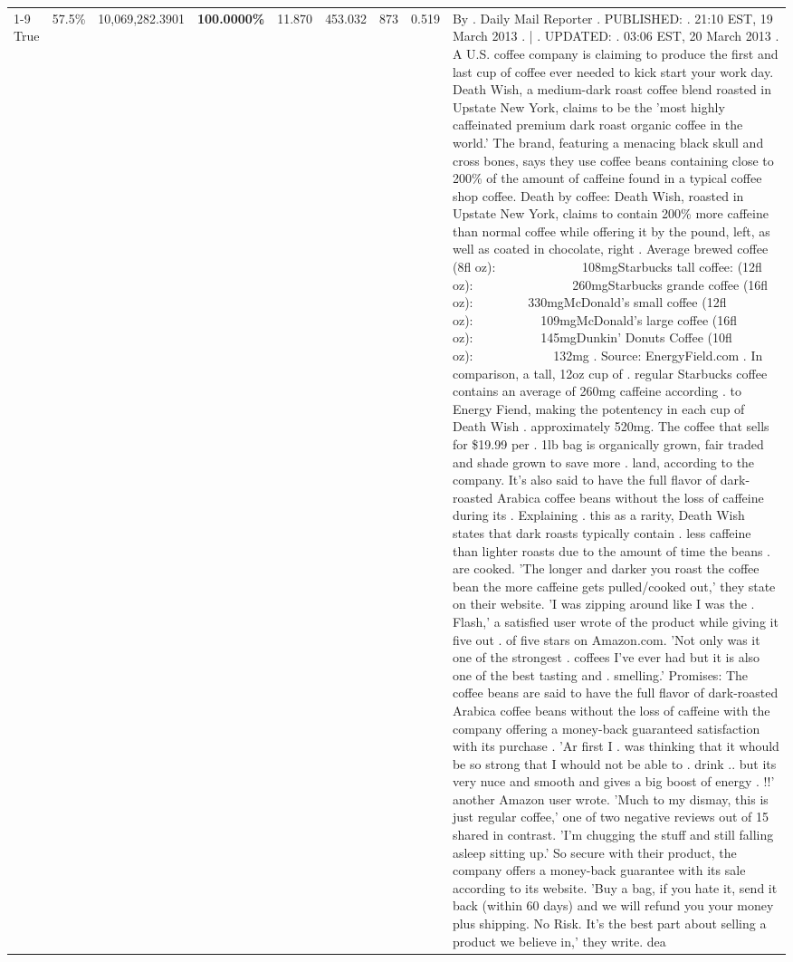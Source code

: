 \begin{table}[H]
{\begin{tabular}{lllrlllll}
\cline{1-9}
True & 57.5\% & 10,069,282.3901 & \bfseries \color{red} 100.0000\% & 11.870 & 453.032 & 873 & 0.519 & By . Daily Mail Reporter . PUBLISHED: . 21:10 EST, 19 March 2013 . | . UPDATED: . 03:06 EST, 20 March 2013 . A U.S. coffee company is claiming to produce the first and last cup of coffee ever needed to kick start your work day. Death Wish, a medium-dark roast coffee blend roasted in Upstate New York, claims to be the 'most highly caffeinated premium dark roast organic coffee in the world.' The brand, featuring a menacing black skull and cross bones, says they use coffee beans containing close to 200\% of the amount of caffeine found in a typical coffee shop coffee. Death by coffee: Death Wish, roasted in Upstate New York, claims to contain 200\% more caffeine than normal coffee while offering it by the pound, left, as well as coated in chocolate, right . Average brewed coffee (8fl oz):              108mgStarbucks tall coffee: (12fl oz):                260mgStarbucks grande coffee (16fl oz):         330mgMcDonald's small coffee (12fl oz):           109mgMcDonald's large coffee (16fl oz):           145mgDunkin' Donuts Coffee (10fl oz):             132mg . Source: EnergyField.com . In comparison, a tall, 12oz cup of . regular Starbucks coffee contains an average of 260mg caffeine according . to Energy Fiend, making the potentency in each cup of Death Wish . approximately 520mg. The coffee that sells for \$19.99 per . 1lb bag is organically grown, fair traded and shade grown to save more . land, according to the company. It's also said to have the full flavor of dark-roasted Arabica coffee beans without the loss of caffeine during its . Explaining . this as a rarity, Death Wish states that dark roasts typically contain . less caffeine than lighter roasts due to the amount of time the beans . are cooked. 'The longer and darker you roast the coffee bean the more caffeine gets pulled/cooked out,' they state on their website. 'I was zipping around like I was the . Flash,' a satisfied user wrote of the product while giving it five out . of five stars on Amazon.com. 'Not only was it one of the strongest . coffees I've ever had but it is also one of the best tasting and . smelling.’ Promises: The coffee beans are said to have the full flavor of dark-roasted Arabica coffee beans without the loss of caffeine with the company offering a money-back guaranteed satisfaction with its purchase . 'Ar first I . was thinking that it whould be so strong that I whould not be able to . drink .. but its very nuce and smooth and gives a big boost of energy . !!' another Amazon user wrote. 'Much to my dismay, this is just regular coffee,' one of two negative reviews out of 15 shared in contrast. 'I'm chugging the stuff and still falling asleep sitting up.' So secure with their product, the company offers a money-back guarantee with its sale according to its website. 'Buy a bag, if you hate it, send it back (within 60 days) and we will refund you your money plus shipping. No Risk. It’s the best part about selling a product we believe in,' they write. dea \\

\end{tabular}}
\end{table}
